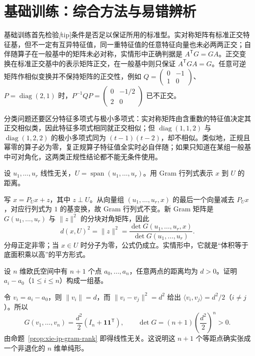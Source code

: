 \section{基础训练：综合方法与易错辨析}
\label{sec:xie-ip-training}

基础训练首先检验\emph[tip]{条件是否足以保证所用的标准型}。实对称矩阵有标准正交特征基，但不一定有互异特征值，同一重特征值的任意特征向量也未必两两正交；自伴随算子在一般基中的矩阵未必对称，实情形中正确判据是 $A^{\mathsf T}G=GA$。正交变换在标准正交基中的表示矩阵正交，在一般基中则只保证 $A^{\mathsf T}GA=G$。任意可逆矩阵作相似变换并不保持矩阵的正交性，例如 $Q=\begin{pmatrix}0&-1\\1&0\end{pmatrix}$、$P=\operatorname{diag}(2,1)$ 时，$P^{-1}QP=\begin{pmatrix}0&-1/2\\2&0\end{pmatrix}$ 已不正交。

分类问题还要区分特征多项式与极小多项式：实对称矩阵由含重数的特征值决定其正交相似类，因此特征多项式相同就正交相似；但 $\operatorname{diag}(1,1,2)$ 与 $\operatorname{diag}(1,2,2)$ 的极小多项式同为 $(t-1)(t-2)$，却不相似。类似地，正规且幂零的算子必为零，复正规算子特征值全实时必自伴随；如果只知道在某组一般基中可对角化，这两类正规性结论都不能无条件使用。

\begin{example}
设 $u_1,\ldots,u_r$ 线性无关，$U=\operatorname{span}(u_1,\ldots,u_r)$。用 Gram 行列式表示 $x$ 到 $U$ 的距离。
\end{example}
\begin{solve}
写 $x=P_Ux+z$，其中 $z\perp U$。从向量组 $(u_1,\ldots,u_r,x)$ 的最后一个向量减去 $P_Ux$，对应行列式为 $1$ 的基变换，故 Gram 行列式不变。新 Gram 矩阵是 $G(u_1,\ldots,u_r)$ 与 $\|z\|^2$ 的分块对角矩阵，因此
\[
d(x,U)^2=\|z\|^2
=\frac{\det G(u_1,\ldots,u_r,x)}{\det G(u_1,\ldots,u_r)}.
\]
分母正定非零；当 $x\in U$ 时分子为零，公式仍成立。实情形中，它就是“体积等于底面积乘以高”的平方形式。
\end{solve}

\begin{example}
设 $n$ 维欧氏空间中有 $n+1$ 个点 $a_0,\ldots,a_n$，任意两点的距离均为 $d>0$。证明 $a_i-a_0$（$1\leq i\leq n$）构成一组基。
\end{example}
\begin{solve}
令 $v_i=a_i-a_0$，则 $\|v_i\|=d$，而 $\|v_i-v_j\|^2=d^2$ 给出 $\langle v_i,v_j\rangle=d^2/2$（$i\ne j$）。所以
\[
G(v_1,\ldots,v_n)=\frac{d^2}{2}(I_n+\boldsymbol1\boldsymbol1^{\mathsf T}),
\qquad \det G=(n+1)\left(\frac{d^2}{2}\right)^n>0.
\]
由命题~\ref{prop:xie-ip-gram-rank} 即得线性无关。这说明这 $n+1$ 个等距点确实张成一个非退化的 $n$ 维单纯形。
\end{solve}

